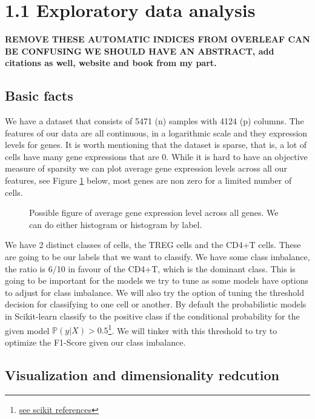 \documentclass{article}
\begin{document}
\section{1.1 Exploratory data analysis}

\textbf{REMOVE THESE AUTOMATIC INDICES FROM OVERLEAF CAN BE CONFUSING}
\textbf{WE SHOULD HAVE AN ABSTRACT, add citations as well, website and book from my part.}


\subsection{Basic facts}
We have a dataset that consists of 5471 (n) samples with 4124 (p) columns. The features of our data are all continuous, in a logarithmic scale and they expression levels 
for genes. It is worth mentioning that the dataset is sparse, that is, a lot of cells have many gene expressions that are 0. While it is hard to have an objective measure
of sparsity we can plot average gene expression levels across all our features, see Figure \ref{fig:hist_sparse} below, most genes are non zero for a limited number of cells.

\begin{figure}[h]

    
    \caption{Possible figure of average gene expression level across all genes. We can do either histogram or histogram by label.}\label{fig:hist_sparse}
\end{figure}


We have 2 distinct classes of cells, the TREG cells and the CD4+T cells. 
These are going to be our labels that we want to classify. We have some class imbalance, the ratio is 6/10 in favour of the CD4+T, 
which is the dominant class. This is going to be important for the models we try to tune as some models have options to adjust for class imbalance.
We will also try the option of tuning the threshold decision for classifying to one cell or another. By default the probabilistic models in Scikit-learn
classify to the positive class if the conditional probability for the given model $\mathbb{P}(\textit{y}|X) > 0.5$\footnote{\href{https://scikit-learn.org/1.5/modules/classification_threshold.html}{see scikit references}}. 
We will tinker with this threshold to try to optimize the F1-Score given our class imbalance.  

\subsection{Visualization and dimensionality redcution}
\end{document}
